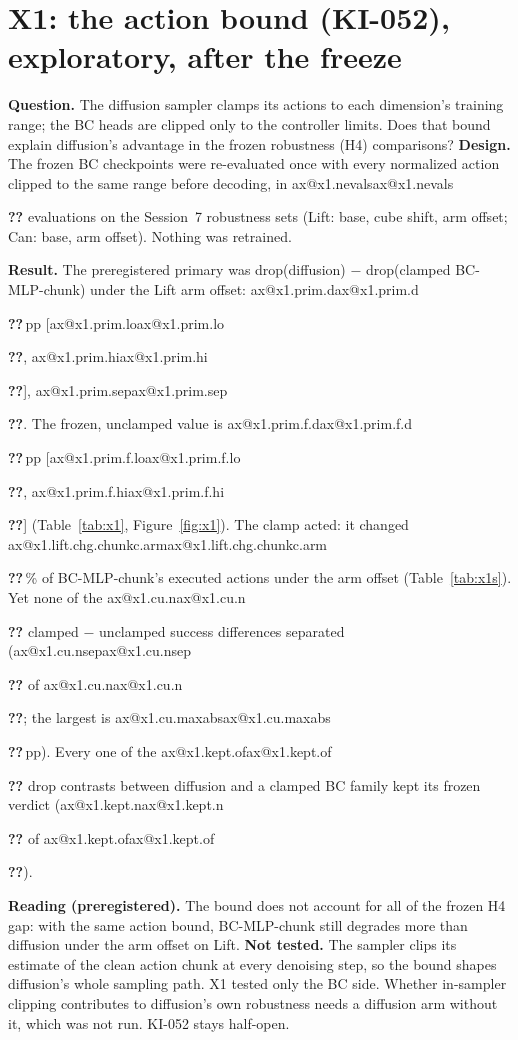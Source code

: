 \documentclass[10pt,a4paper]{article}
\makeatletter
\newcommand{\ax}[1]{\ifcsname ax@#1\endcsname\csname ax@#1\endcsname\else
  \PackageError{roboforge}{Undefined addendum key #1}{Run make addendum-assets}\textbf{??}\fi}
\newcommand{\pp}{\,pp}
\newcommand{\pct}{\,\%}
\makeatother
\begin{document}
\begin{table}[h]
\centering
\caption{The three pinned result files; every value of this addendum comes from them.}
\label{tab:sources}

\end{table}

\section{X1: the action bound (KI-052), exploratory, after the freeze}
\textbf{Question.} The diffusion sampler clamps its actions to each dimension's training range;
the BC heads are clipped only to the controller limits. Does that bound explain diffusion's
advantage in the frozen robustness (H4) comparisons?
\textbf{Design.} The frozen BC checkpoints were re-evaluated once with every normalized action
clipped to the same range before decoding, in \ax{x1.nevals} evaluations on the Session~7
robustness sets (Lift: base, cube shift, arm offset; Can: base, arm offset). Nothing was
retrained.

\textbf{Result.} The preregistered primary was drop(diffusion) $-$ drop(clamped BC-MLP-chunk)
under the Lift arm offset: \ax{x1.prim.d}\pp{} [\ax{x1.prim.lo}, \ax{x1.prim.hi}],
\ax{x1.prim.sep}. The frozen, unclamped value is \ax{x1.prim.f.d}\pp{} [\ax{x1.prim.f.lo},
\ax{x1.prim.f.hi}] (Table~\ref{tab:x1}, Figure~\ref{fig:x1}). The clamp acted: it changed
\ax{x1.lift.chg.chunkc.arm}\pct{} of BC-MLP-chunk's executed actions under the arm offset
(Table~\ref{tab:x1s}). Yet none of the \ax{x1.cu.n} clamped $-$ unclamped success differences
separated (\ax{x1.cu.nsep} of \ax{x1.cu.n}; the largest is \ax{x1.cu.maxabs}\pp). Every one of
the \ax{x1.kept.of} drop contrasts between diffusion and a clamped BC family kept its frozen
verdict (\ax{x1.kept.n} of \ax{x1.kept.of}).

\textbf{Reading (preregistered).} The bound does not account for all of the frozen H4 gap:
with the same action bound, BC-MLP-chunk still degrades more than diffusion under the arm
offset on Lift.
\textbf{Not tested.} The sampler clips its estimate of the clean action chunk at every
denoising step, so the bound shapes diffusion's whole sampling path. X1 tested only the BC
side. Whether in-sampler clipping contributes to diffusion's own robustness needs a diffusion
arm without it, which was not run. KI-052 stays half-open.

\begin{table}[h]
\centering\small
\caption{X1 (exploratory, after the freeze): the preregistered primary and its legs.}
\label{tab:x1}

\end{table}
\end{document}
